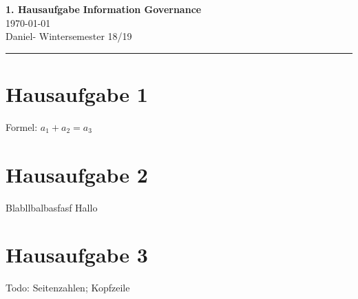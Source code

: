 \documentclass[
    a4paper,
    11pt,
    fleqn,
    notitlepage,
    parskip=half,
    egregdoesnotlikesansseriftitles
]{scrartcl}
\title{\aufgabe}
\subtitle{\modul}
\author{\name}
\date{\datum}
\newcommand{\aufgabe}{1. Hausaufgabe}
\newcommand{\modul}{Information Governance}
\newcommand{\sem}{Wintersemester 18/19}
\newcommand{\name}{Daniel}
\newcommand{\matrk}{}
\newcommand{\uni}{}
\newcommand{\datum}{\today}
\begin{document}
\thispagestyle{scrplain}

\noindent\Large\textbf{\aufgabe} \hfill \textbf{\modul} \\
\normalsize
\datum \hfill \uni \\
\name \space - \space \matrk \hfill \sem \\
\rule{\textwidth}{0.1mm}



\section*{Hausaufgabe 1}

Formel: $ a_1 + a_2 = a_3 $

\newpage

\section*{Hausaufgabe 2}

Blabllbalbasfasf Hallo

\newpage

\section*{Hausaufgabe 3}

Todo: Seitenzahlen; Kopfzeile

\end{document}
